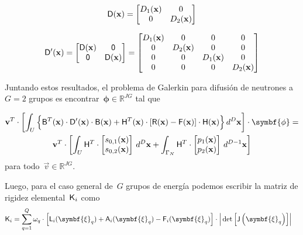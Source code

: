 \documentclass[
  12pt,
  a4paper,
  table]{scrbook}
\theoremstyle{plain}
\theoremstyle{definition}
\theoremstyle{plain}
\theoremstyle{plain}
\theoremstyle{remark}
\begin{document}
\[
\mathsf{D}(\mathbf{x}) =
\begin{bmatrix}
D_1(\mathbf{x}) & 0 \\
0 & D_2(\mathbf{x}) \\
\end{bmatrix}
\]

\[
\mathsf{D}^\prime(\mathbf{x}) =
\begin{bmatrix}
\mathsf{D}(\mathbf{x}) & \mathsf{0} \\
\mathsf{0} & \mathsf{D}(\mathbf{x}) \\
\end{bmatrix}
=
\begin{bmatrix}
D_1(\mathbf{x}) & 0 & 0 & 0 \\
0 & D_2(\mathbf{x}) & 0 & 0 \\
0 & 0 & D_1(\mathbf{x}) & 0 \\
0 & 0 & 0 & D_2(\mathbf{x}) \\
\end{bmatrix}
\]

Juntando estos resultados, el problema de Galerkin para difusión de
neutrones a~\(G=2\) grupos es
encontrar~\(\symbf{\phi} \in \mathbb{R}^{JG}\) tal que

\[
\begin{gathered}
\vec{v}^T \cdot
\left[
\int_U
\Big\{
\mat{B}^T(\vec{x})
\cdot
\mat{D}^{\prime}(\vec{x})
\cdot
\mat{B}(\vec{x})
+
\mat{H}^T(\vec{x})
\cdot
\left[ \mat{R}(\vec{x})-\mat{F}(\vec{x})\right]
\cdot
\mat{H}(\vec{x})
\Big\}
\, d^D\vec{x}
\right]
\cdot
\symbf{\phi}
=\\
\vec{v}^T \cdot
\left[
\int_U
\mat{H}^T
\cdot
\begin{bmatrix}
 s_{0,1}(\vec{x}) \\
 s_{0,2}(\vec{x}) \\
\end{bmatrix}
\, d^D\vec{x}
+
\int_{\Gamma_N}
\mat{H}^T
\cdot
\begin{bmatrix}
 p_1(\vec{x}) \\
 p_2(\vec{x}) \\
\end{bmatrix}
\, d^{D-1}\vec{x}
\right]
\end{gathered}
\] para todo~\(\vec{v}\in \mathbb{R}^{JG}\).

Luego, para el caso general de~\(G\) grupos de energía podemos escribir
la matriz de rigidez elemental~\(\mathsf{K}_i\) como \[
\begin{aligned}
\mat{K}_i &= 
\sum_{q=1}^Q \omega_q \cdot \left[ \mat{L}_i(\symbf{\xi}_q) + \mat{A}_i(\symbf{\xi}_q) - \mat{F}_i(\symbf{\xi}_q)\right] \cdot \Big|\det{\left[\mat{J}\left(\symbf{\xi}_q\right)\right]}\Big|
\end{aligned}
\]
\end{document}
